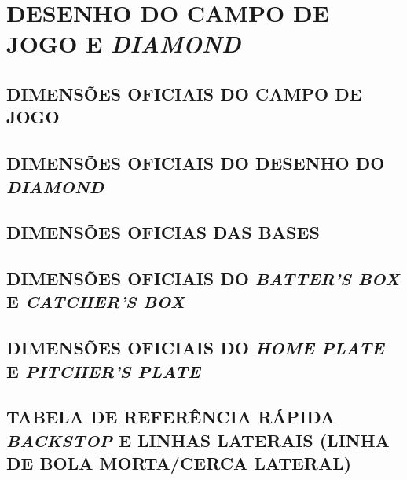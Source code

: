 \chapter{DESENHO DO CAMPO DE JOGO E \textit{DIAMOND}}
\minitoc%


\section{DIMENSÕES OFICIAIS DO CAMPO DE JOGO}

\section{DIMENSÕES OFICIAIS DO DESENHO DO \textit{DIAMOND}}

\section{DIMENSÕES OFICIAS DAS BASES}

\section{DIMENSÕES OFICIAIS DO \textit{BATTER'S BOX} E \textit{CATCHER'S BOX}}

\section{DIMENSÕES OFICIAIS DO \textit{HOME PLATE} E \textit{PITCHER'S PLATE}}

\section{TABELA DE REFERÊNCIA RÁPIDA \textit{BACKSTOP} E LINHAS LATERAIS (LINHA DE BOLA MORTA/CERCA LATERAL)}


